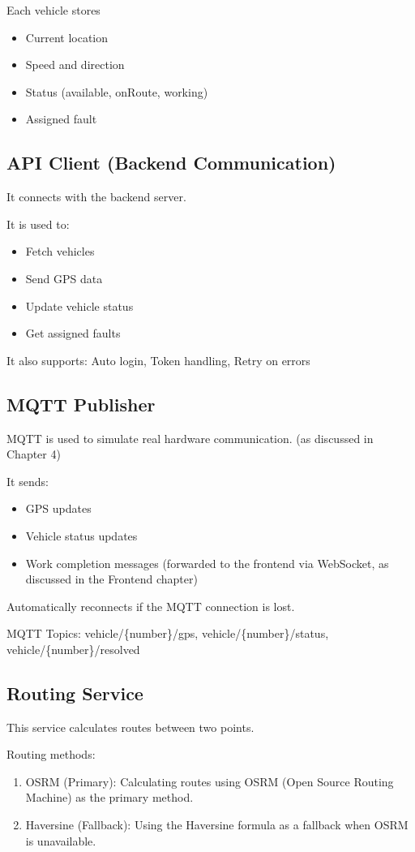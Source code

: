 Each vehicle stores
\begin{itemize}
    \item Current location
    \item Speed and direction
    \item Status (available, onRoute, working)
    \item Assigned fault
\end{itemize}

\subsection{API Client (Backend Communication)}
It connects with the backend server.

It is used to:
\begin{itemize}
    \item Fetch vehicles
    \item Send GPS data
    \item Update vehicle status
    \item Get assigned faults
\end{itemize}

It also supports: Auto login, Token handling, Retry on errors

\subsection{MQTT Publisher}
MQTT is used to simulate real hardware communication. (as discussed in Chapter 4)

It sends:
\begin{itemize}
    \item GPS updates
    \item Vehicle status updates
    \item Work completion messages (forwarded to the frontend via WebSocket, as discussed in the Frontend chapter)
\end{itemize}

Automatically reconnects if the MQTT connection is lost.

MQTT Topics: vehicle/\{number\}/gps, vehicle/\{number\}/status, vehicle/\{number\}/resolved

\subsection{Routing Service}
This service calculates routes between two points.

Routing methods:
\begin{enumerate}
    \item OSRM (Primary): Calculating routes using OSRM (Open Source Routing Machine) as the primary method.
    \item Haversine (Fallback): Using the Haversine formula as a fallback when OSRM is unavailable.
\end{enumerate}

